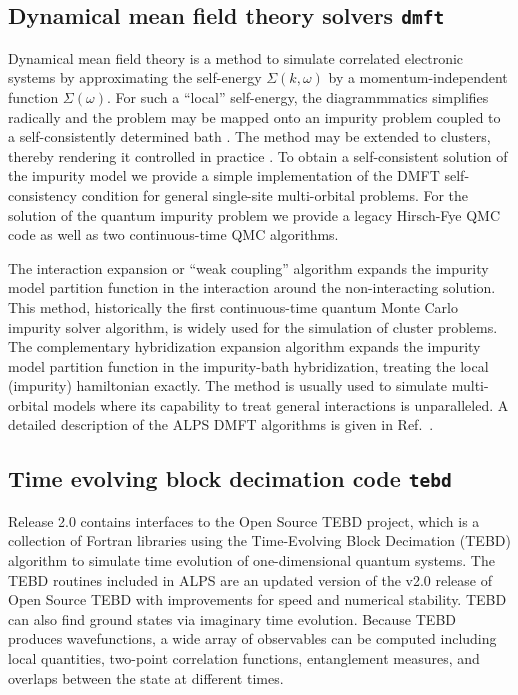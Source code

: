 \documentclass[12pt]{iopart}
\begin{document}
\subsection{Dynamical mean field theory solvers {\tt dmft}}
Dynamical mean field theory is a method to simulate correlated electronic systems by approximating the self-energy $\Sigma(k,\omega)$ by a momentum-independent 
function $\Sigma(\omega)$. For such a ``local'' self-energy, the diagrammmatics simplifies radically and the  problem may be mapped onto an impurity problem
coupled to a self-consistently determined bath \cite{Georges96,Kotliar06}. The method may be extended to clusters, thereby rendering it controlled in practice \cite{Maier05}.
To obtain a self-consistent solution of the impurity model we provide a simple implementation of the DMFT self-consistency condition for general single-site multi-orbital problems.
For the solution of the quantum impurity problem we provide a legacy Hirsch-Fye QMC code \cite{Hirsch86} as well as two continuous-time QMC algorithms.

The interaction expansion or ``weak coupling'' algorithm \cite{Rubtsov04,Rubtsov05} expands the impurity model partition function in the interaction around the non-interacting solution. This method, historically
the first continuous-time quantum Monte Carlo impurity solver algorithm, is widely used for the simulation of cluster problems.
The complementary hybridization expansion algorithm \cite{Werner06,Werner06Kondo} expands the impurity model partition function in the impurity-bath hybridization, treating the local (impurity) hamiltonian exactly. 
The method is usually used to simulate multi-orbital models where its capability to treat general interactions is unparalleled. A detailed description of the ALPS DMFT algorithms is given in Ref.~\cite{ALPSDMFT}.

\subsection{Time evolving block decimation code {\tt tebd}}
Release 2.0 contains interfaces to the Open Source TEBD project\cite{ostebd}, which is a collection of Fortran libraries using the Time-Evolving Block Decimation (TEBD) algorithm\cite{vidal1, vidal2} to simulate time evolution of one-dimensional quantum systems.  The TEBD routines included in ALPS are an updated version of the v2.0 release of Open Source TEBD with improvements for speed and numerical stability.  TEBD can also find ground states via imaginary time evolution.  Because TEBD produces wavefunctions, a wide array of observables can be computed including local quantities, two-point correlation functions, entanglement measures, and overlaps between the state at different times.
\end{document}
